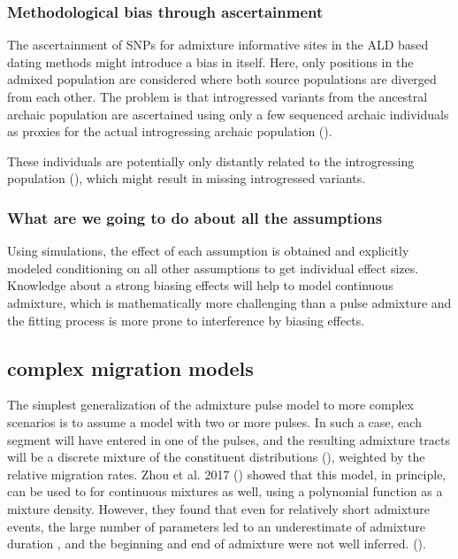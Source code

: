 \documentclass[]{article}
\begin{document}
\subsubsection{Methodological bias through
ascertainment}\label{methodological-bias-through-ascertainment}

The ascertainment of SNPs for admixture informative sites in the ALD
based dating methods might introduce a bias in itself. Here, only
positions in the admixed population are considered where both source
populations are diverged from each other. The problem is that
introgressed variants from the ancestral archaic population are
ascertained using only a few sequenced archaic individuals as proxies
for the actual introgressing archaic population
(\cite{sankararaman_date_2012,fu_genome_2014,sankararaman_combined_2016,moorjani_genetic_2016}).

These individuals are potentially only distantly related to the
introgressing population (\cite{jacobs_multiple_2019}), which might
result in missing introgressed variants.

\subsubsection{What are we going to do about all the
assumptions}\label{what-are-we-going-to-do-about-all-the-assumptions}

Using simulations, the effect of each assumption is obtained and
explicitly modeled conditioning on all other assumptions to get
individual effect sizes. Knowledge about a strong biasing effects will
help to model continuous admixture, which is mathematically more
challenging than a pulse admixture and the fitting process is more prone
to interference by biasing effects.


\subsection{complex migration models}

The simplest generalization of the admixture pulse model to more complex scenarios is to assume a model with two or more pulses. In such a case,  each segment will have entered in one of the pulses, and the resulting admixture tracts will be a discrete mixture of the constituent distributions (\cite{pickrell_ancient_2014}), weighted by the relative migration rates. Zhou et al. 2017 (\cite{zhou_modeling_2017}) showed that this model, in principle, can be used to for continuous mixtures as well, using a polynomial function as a mixture density. However, they found that even for relatively short admixture events, the large number of parameters led to an underestimate of admixture duration  \cite{zhou_inference_2017}, and the beginning and end of admixture were not well inferred.
(\cite{zhou_modeling_2017,zhou_inference_2017}). 
\end{document}
